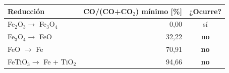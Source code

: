 \begin{tabular}{lrc}
    \hline
    Reducción & CO/(CO+CO$_2$) mínimo [\%] & ¿Ocurre? \\
    \hline
    Fe$_2$O$_3 \rightarrow$ Fe$_3$O$_4$ & 0,00 & sí \\
    Fe$_3$O$_4 \rightarrow$ FeO & 32,22 & \textbf{no} \\
    FeO $\rightarrow$ Fe & 70,91 & \textbf{no} \\
    FeTiO$_3 \rightarrow$ Fe + TiO$_2$ & 94,66 & \textbf{no} \\
    \hline
\end{tabular}
